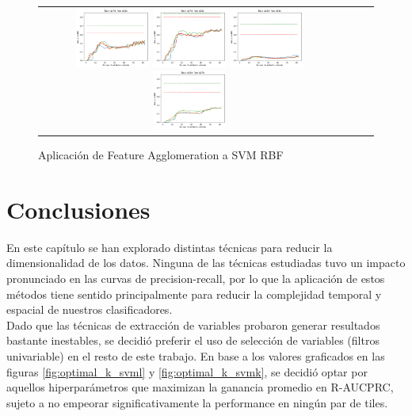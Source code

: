 \begin{figure}[h!]
\begin{tabular}{cccc}
\includegraphics[width=0.25\textwidth]{Kap5/rbf_ALL_LINKAGES_train=b278test=b234.png}  \includegraphics[width=0.25\textwidth]{Kap5/rbf_ALL_LINKAGES_train=b278test=b261.png} 
 \includegraphics[width=0.25\textwidth]{Kap5/rbf_ALL_LINKAGES_train=b360test=b234.png}  \includegraphics[width=0.25\textwidth]{Kap5/rbf_ALL_LINKAGES_train=b360test=b278.png} 
\end{tabular}
\caption{Aplicación de Feature Agglomeration a SVM RBF}
\label{fig:agg_k}
\end{figure}

\section{Conclusiones}
\label{mejores_fs}
En este capítulo se han explorado distintas técnicas para reducir la dimensionalidad de los datos. Ninguna de las técnicas estudiadas tuvo un impacto pronunciado en las curvas de precision-recall, por lo que la aplicación de estos métodos tiene sentido principalmente para reducir la complejidad temporal y espacial de nuestros clasificadores. \\

Dado que las técnicas de extracción de variables probaron generar resultados bastante inestables, se decidió preferir el uso de selección de variables (filtros univariable) en el resto de este trabajo. En base a los valores graficados en las figuras \ref{fig:optimal_k_svml} y \ref{fig:optimal_k_svmk}, se decidió optar por aquellos hiperparámetros que maximizan la ganancia promedio en R-AUCPRC, sujeto a no empeorar significativamente la performance en ningún par de tiles.

